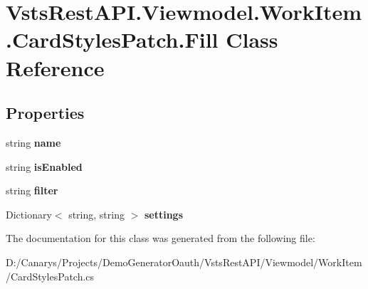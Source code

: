 \hypertarget{class_vsts_rest_a_p_i_1_1_viewmodel_1_1_work_item_1_1_card_styles_patch_1_1_fill}{}\section{Vsts\+Rest\+A\+P\+I.\+Viewmodel.\+Work\+Item.\+Card\+Styles\+Patch.\+Fill Class Reference}
\label{class_vsts_rest_a_p_i_1_1_viewmodel_1_1_work_item_1_1_card_styles_patch_1_1_fill}
\subsection*{Properties}
\begin{DoxyCompactItemize}
\item 
\mbox{\label{class_vsts_rest_a_p_i_1_1_viewmodel_1_1_work_item_1_1_card_styles_patch_1_1_fill_a65cccd165e5e026535f0375754c8f49c}} 
string {\bfseries name}
\item 
\mbox{\label{class_vsts_rest_a_p_i_1_1_viewmodel_1_1_work_item_1_1_card_styles_patch_1_1_fill_adc32fb451d7601735fbf2fc43a48d7be}} 
string {\bfseries is\+Enabled}
\item 
\mbox{\label{class_vsts_rest_a_p_i_1_1_viewmodel_1_1_work_item_1_1_card_styles_patch_1_1_fill_a4688fc0b36d338c86235a12379515826}} 
string {\bfseries filter}
\item 
\mbox{\label{class_vsts_rest_a_p_i_1_1_viewmodel_1_1_work_item_1_1_card_styles_patch_1_1_fill_ac9190c5e0fe094c4f1dcd8bd31f7affb}} 
Dictionary$<$ string, string $>$ {\bfseries settings}
\end{DoxyCompactItemize}


The documentation for this class was generated from the following file\+:\begin{DoxyCompactItemize}
\item 
D\+:/\+Canarys/\+Projects/\+Demo\+Generator\+Oauth/\+Vsts\+Rest\+A\+P\+I/\+Viewmodel/\+Work\+Item/Card\+Styles\+Patch.\+cs\end{DoxyCompactItemize}
